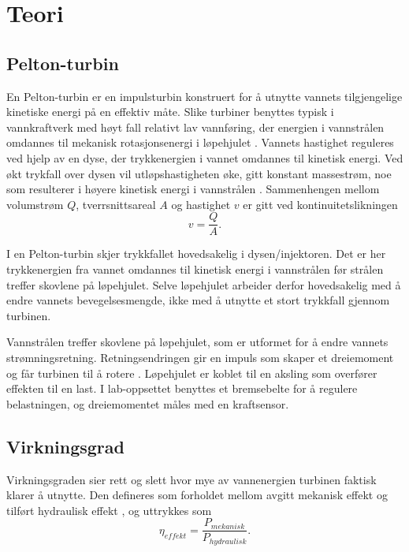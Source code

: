 \section*{Teori}
\setcounter{section}{1}
\setcounter{subsection}{0}

\subsection{Pelton-turbin}


En Pelton-turbin er en impulsturbin konstruert for å utnytte vannets tilgjengelige kinetiske energi på en effektiv måte. Slike turbiner benyttes typisk i vannkraftverk med høyt fall relativt lav vannføring, der energien i vannstrålen omdannes til mekanisk rotasjonsenergi i løpehjulet \parencite{Turbiner}.
Vannets hastighet reguleres ved hjelp av en dyse, der trykkenergien i vannet omdannes til kinetisk energi. Ved økt trykfall over dysen vil utløpshastigheten øke, gitt konstant massestrøm, noe som resulterer i høyere kinetisk energi i vannstrålen \parencite{HM4501_Pelton-Turbine}. Sammenhengen mellom volumstrøm $Q$, tverrsnittsareal $A$ og hastighet $v$ er gitt ved kontinuitetslikningen 
\[
v = \frac{Q}{A}.
\]


I en Pelton-turbin skjer trykkfallet hovedsakelig i dysen/injektoren. Det er her trykkenergien fra vannet omdannes til kinetisk energi i vannstrålen før strålen treffer skovlene på løpehjulet. Selve løpehjulet arbeider derfor hovedsakelig med å endre vannets bevegelsesmengde, ikke med å utnytte et stort trykkfall gjennom turbinen.

Vannstrålen treffer skovlene på løpehjulet, som er utformet for å endre vannets strømningsretning. Retningsendringen gir en impuls som skaper et dreiemoment og får turbinen til å rotere \parencite{Turbiner}. Løpehjulet er koblet til en aksling som overfører effekten til en last. I lab-oppsettet benyttes et bremsebelte for å regulere belastningen, og dreiemomentet måles med en kraftsensor.

\subsection{Virkningsgrad}
Virkningsgraden sier rett og slett hvor mye av vannenergien turbinen faktisk klarer å utnytte. Den defineres som forholdet mellom avgitt mekanisk effekt og tilført hydraulisk effekt \parencite{Turbiner}, og uttrykkes som
\[
\eta_{effekt} = \frac{P_{mekanisk}} {P_{hydraulisk}}.
\]

